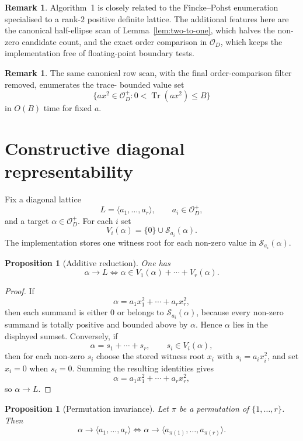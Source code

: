 \documentclass[manuscript]{acmart}
\theoremstyle{plain}
\newtheorem{proposition}[theorem]{Proposition}
\theoremstyle{definition}
\theoremstyle{nonitalicremark}
\newtheorem{remark}[theorem]{Remark}
\newcommand{\OO}{\mathcal{O}}
\newcommand{\OD}{\OO_D}
\newcommand{\Tr}{\operatorname{Tr}}
\newcommand{\cS}{\mathcal{S}}
\begin{document}
\begin{remark}
Algorithm~1 is closely related to the Fincke--Pohst enumeration \cite{FinckePohst} specialised to a
rank-$2$ positive definite lattice. The additional features here are the canonical half-ellipse scan
of Lemma~\ref{lem:two-to-one}, which halves the non-zero candidate count, and the exact order
comparison in $\OD$, which keeps the implementation free of floating-point boundary tests.
\end{remark}

\begin{remark}\label{rem:trace-bounded-variant}
The same canonical row scan, with the final order-comparison filter removed, enumerates the trace-
bounded value set
\[
\{a x^2\in\OD^+ : 0<\Tr(a x^2)\le B\}
\]
in $O(B)$ time for fixed $a$.
\end{remark}

\section{Constructive diagonal representability}\label{sec:repr}

Fix a diagonal lattice
\[
L=\langle a_1,\dots,a_r\rangle,
\qquad a_i\in\OD^+,
\]
and a target $\alpha\in\OD^+$. For each $i$ set
\[
V_i(\alpha)=\{0\}\cup\cS_{a_i}(\alpha).
\]
The implementation stores one witness root for each non-zero value in $\cS_{a_i}(\alpha)$.

\begin{proposition}[Additive reduction]\label{prop:additive-reduction}
One has
\[
\alpha\to L
\iff
\alpha\in V_1(\alpha)+\cdots+V_r(\alpha).
\]
\end{proposition}

\begin{proof}
If
\[
\alpha=a_1x_1^2+\cdots+a_rx_r^2,
\]
then each summand is either $0$ or belongs to $\cS_{a_i}(\alpha)$, because every non-zero summand is
totally positive and bounded above by $\alpha$. Hence $\alpha$ lies in the displayed sumset.
Conversely, if
\[
\alpha=s_1+\cdots+s_r,
\qquad s_i\in V_i(\alpha),
\]
then for each non-zero $s_i$ choose the stored witness root $x_i$ with $s_i=a_i x_i^2$, and set
$x_i=0$ when $s_i=0$. Summing the resulting identities gives
\[
\alpha=a_1x_1^2+\cdots+a_rx_r^2,
\]
so $\alpha\to L$.
\end{proof}

\begin{proposition}[Permutation invariance]\label{prop:perm}
Let $\pi$ be a permutation of $\{1,\dots,r\}$. Then
\[
\alpha\to \langle a_1,\dots,a_r\rangle
\iff
\alpha\to \langle a_{\pi(1)},\dots,a_{\pi(r)}\rangle.
\]
\end{proposition}
\end{document}
